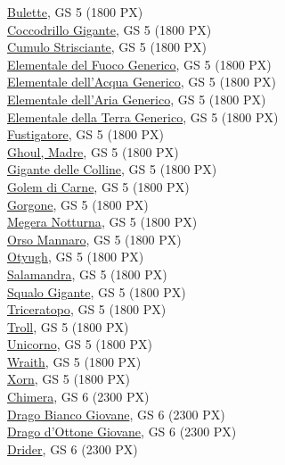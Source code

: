 \begin{multicols}{3}
{\hyperlink{Bulette}{Bulette}, GS 5 (1800 PX)\\
\hyperlink{Coccodrillo Gigante}{Coccodrillo Gigante}, GS 5 (1800 PX)\\
\hyperlink{Cumulo Strisciante}{Cumulo Strisciante}, GS 5 (1800 PX)\\
\hyperlink{Elementale del Fuoco Generico}{Elementale del Fuoco Generico}, GS 5 (1800 PX)\\
\hyperlink{Elementale dell'Acqua Generico}{Elementale dell'Acqua Generico}, GS 5 (1800 PX)\\
\hyperlink{Elementale dell'Aria Generico}{Elementale dell'Aria Generico}, GS 5 (1800 PX)\\
\hyperlink{Elementale della Terra Generico}{Elementale della Terra Generico}, GS 5 (1800 PX)\\
\hyperlink{Fustigatore}{Fustigatore}, GS 5 (1800 PX)\\
\hyperlink{Ghoul, Madre}{Ghoul, Madre}, GS 5 (1800 PX)\\
\hyperlink{Gigante delle Colline}{Gigante delle Colline}, GS 5 (1800 PX)\\
\hyperlink{Golem di Carne}{Golem di Carne}, GS 5 (1800 PX)\\
\hyperlink{Gorgone}{Gorgone}, GS 5 (1800 PX)\\
\hyperlink{Megera Notturna}{Megera Notturna}, GS 5 (1800 PX)\\
\hyperlink{Orso Mannaro}{Orso Mannaro}, GS 5 (1800 PX)\\
\hyperlink{Otyugh}{Otyugh}, GS 5 (1800 PX)\\
\hyperlink{Salamandra}{Salamandra}, GS 5 (1800 PX)\\
\hyperlink{Squalo Gigante}{Squalo Gigante}, GS 5 (1800 PX)\\
\hyperlink{Triceratopo}{Triceratopo}, GS 5 (1800 PX)\\
\hyperlink{Troll}{Troll}, GS 5 (1800 PX)\\
\hyperlink{Unicorno}{Unicorno}, GS 5 (1800 PX)\\
\hyperlink{Wraith}{Wraith}, GS 5 (1800 PX)\\
\hyperlink{Xorn}{Xorn}, GS 5 (1800 PX)\\
\hyperlink{Chimera}{Chimera}, GS 6 (2300 PX)\\
\hyperlink{Drago Bianco Giovane}{Drago Bianco Giovane}, GS 6 (2300 PX)\\
\hyperlink{Drago d'Ottone Giovane}{Drago d'Ottone Giovane}, GS 6 (2300 PX)\\
\hyperlink{Drider}{Drider}, GS 6 (2300 PX)\\
}
\end{multicols}
